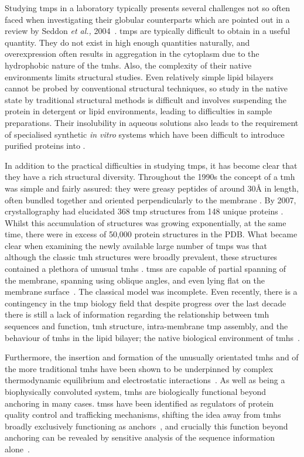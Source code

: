 Studying \gls{tmp}s in a laboratory typically presents several challenges not so often faced when investigating their globular counterparts which are pointed out in a review by Seddon \textit{et al.,} 2004~\cite{Seddon2004}.
\gls{tmp}s are typically difficult to obtain in a useful quantity.
They do not exist in high enough quantities naturally, and overexpression often results in aggregation in the cytoplasm due to the hydrophobic nature of the \gls{tmh}s.
Also, the complexity of their native environments limits structural studies.
Even relatively simple lipid bilayers cannot be probed by conventional structural techniques, so study in the native state by traditional structural methods is difficult and involves suspending the protein in detergent or lipid environments, leading to difficulties in sample preparations.
Their insolubility in aqueous solutions also leads to the requirement of specialised synthetic \textit{in vitro} systems which have been difficult to introduce purified proteins into \cite{Seddon2004}.

In addition to the practical difficulties in studying \gls{tmp}s, it has become clear that they have a rich structural diversity.
Throughout the 1990s the concept of a \gls{tmh} was simple and fairly assured: they were greasy peptides of around 30{\AA} in length, often bundled together and oriented perpendicularly to the membrane \cite{VonHeijne2006}.
By 2007, crystallography had elucidated 368 \gls{tmp} structures from 148 unique proteins \cite{Carpenter2008}.
Whilst this accumulation of structures was growing exponentially, at the same time, there were in excess of 50,000 protein structures in the PDB.
What became clear when examining the newly available large number of \gls{tmp}s was that although the classic \gls{tmh} structures were broadly prevalent, these structures contained a plethora of unusual \gls{tmh}s \cite{VonHeijne2006}.
\gls{tms}s are capable of partial spanning of the membrane, spanning using oblique angles, and even lying flat on the membrane surface~\cite{VonHeijne2006, Elofsson2007}.
The classical model was incomplete.
Even recently, there is a contingency in the  \gls{tmp} biology field that despite progress over the last decade there is still a lack of information regarding the relationship between \gls{tmh} sequences and function, \gls{tmh} structure, intra-membrane \gls{tmp} assembly, and the behaviour of \gls{tmh}s in the lipid bilayer; the native biological environment of \gls{tmh}s~\cite{Ladokhin2015}.

Furthermore, the insertion and formation of the unusually orientated \gls{tmh}s and of the more traditional \gls{tmh}s have been shown to be underpinned by complex thermodynamic equilibrium and electrostatic interactions~\cite{Cymer2015, Elisa2012, Ismail2015}.
As well as being a biophysically convoluted system, \gls{tmh}s are biologically functional beyond anchoring in many cases.
\gls{tms}s have been identified as regulators of protein quality control and trafficking mechanisms, shifting the idea away from \gls{tmh}s broadly exclusively functioning as anchors~\cite{Hessa2011}, and crucially this function beyond anchoring can be revealed by sensitive analysis of the sequence information alone~\cite{Wong2011, Wong2012}.

